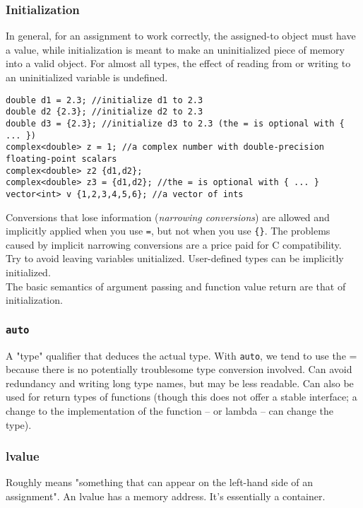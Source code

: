 \documentclass[8pt, table, xcdraw]{article}%
\begin{document}
\subsubsection{Initialization}
 In  general,  for  an  assignment  to  work  correctly,  the assigned-to  object  must  have  a  value, while initialization is meant to make an uninitialized piece of memory into a valid object.  For almost all types, the effect of reading from or writing to an uninitialized variable is undefined.

\begin{lstlisting}
double d1 = 2.3; //initialize d1 to 2.3
double d2 {2.3}; //initialize d2 to 2.3
double d3 = {2.3}; //initialize d3 to 2.3 (the = is optional with { ... })
complex<double> z = 1; //a complex number with double-precision floating-point scalars
complex<double> z2 {d1,d2};
complex<double> z3 = {d1,d2}; //the = is optional with { ... }
vector<int> v {1,2,3,4,5,6}; //a vector of ints
\end{lstlisting}

Conversions that lose information (\textit{narrowing conversions}) are allowed and implicitly applied when you use \lstinline{=}, but not when you use \lstinline|{}|. The problems caused by implicit narrowing conversions are a price paid for C compatibility.\\
Try to avoid leaving variables unitialized. User-defined types can be implicitly initialized.\\
The basic semantics of argument passing and function value return are that of initialization.

\subsubsection{\lstinline{auto}}

A "type" qualifier that deduces the actual type. With \lstinline{auto}, we tend to use the = because there is no potentially troublesome type conversion involved. Can avoid redundancy and writing long type names, but may be less readable. Can also be used for return types of functions (though this does not offer a stable interface; a change to the implementation of the function -- or lambda -- can change the type).

\subsubsection{lvalue} \label{lvalue}

Roughly means "something that can appear on the left-hand side of an assignment". An lvalue has a memory address. It's essentially a container.
\end{document}

